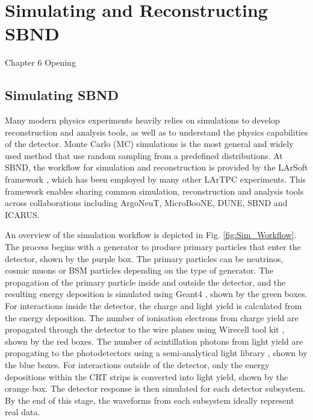 
\chapter{Simulating and Reconstructing SBND}
\label{Chapter6}

\ifpdf
    \graphicspath{{Chapter6/Figs/Raster/}{Chapter6/Figs/PDF/}{Chapter6/Figs/}}
\else
    \graphicspath{{Chapter6/Figs/Vector/}{Chapter6/Figs/}}
\fi


Chapter 6 Opening

\newpage

\section{Simulating SBND}

Many modern physics experiments heavily relies on simulations to develop reconstruction and analysis tools, as well as to understand the physics capabilities of the detector.
Monte Carlo (MC) simulations is the most general and widely used method that use random sampling from a predefined distributions. 
At SBND, the workflow for simulation and reconstruction is provided by the LArSoft framework \cite{}, which has been employed by many other LArTPC experiments.
This framework enables sharing common simulation, reconstruction and analysis tools across collaborations including ArgoNeuT, MicroBooNE, DUNE, SBND and ICARUS.

An overview of the simulation workflow is depicted in Fig. \ref{fig:Sim_Workflow}.
The process begins with a generator to produce primary particles that enter the detector, shown by the purple box.
The primary particles can be neutrinos, cosmic muons or BSM particles depending on the type of generator.
The propagation of the primary particle inside and outside the detector, and the resulting energy deposition is simulated using Geant4 \cite{geant4}, shown by the green boxes.
For interactions inside the detector, the charge and light yield is calculated from the energy deposition.
The number of ionisation electrons from charge yield are propagated through the detector to the wire planes using Wirecell tool kit \cite{wirecell}, shown by the red boxes.
The number of scintillation photons from light yield are propagating to the photodetectors using a semi-analytical light library \cite{}, shown by the blue boxes.
For interactions outside of the detector, only the energy depositions within the CRT strips is converted into light yield, shown by the orange box.
The detector response is then simulated for each detector subsystem.
By the end of this stage, the waveforms from each subsystem ideally represent real data.

